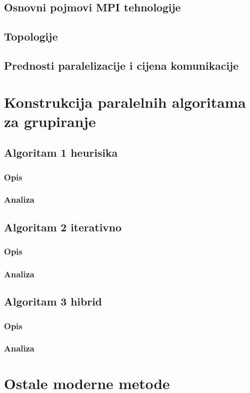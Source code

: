 \documentclass[a4paper,twoside,12pt]{memoir} %
\begin{document}
\section[Osnovni pojmovi MPI tehnologije][mpi]{Osnovni pojmovi MPI tehnologije}
\section[Topologija][topologija]{Topologije}
\section[Prednosti paralelizacije i cijena komunikacije][pred-man-paralel]{Prednosti paralelizacije i cijena komunikacije}
\chapter{Konstrukcija paralelnih algoritama za grupiranje}
\section{Algoritam 1 heurisika}
\subsection{Opis}
\subsection{Analiza}
\section{Algoritam 2 iterativno}
\subsection{Opis}
\subsection{Analiza}
\section{Algoritam 3 hibrid}
\subsection{Opis}
\subsection{Analiza}
\chapter{Ostale moderne metode}
\end{document}
